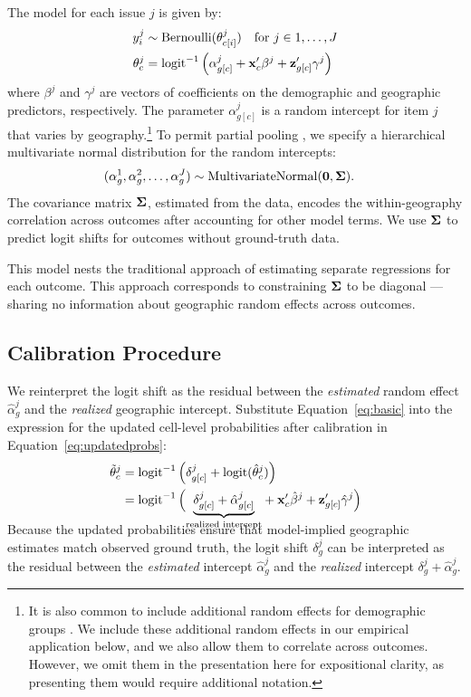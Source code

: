 The model for each issue $j$ is given by:
\begin{equation}
\begin{aligned}
	y^j_i &\sim \text{Bernoulli}(\theta_{c[i]}^j) \quad \text{for $j \in 1, \dots, J$}\\
	\theta_{c}^j &= \text{logit}^{-1}\left( \alpha_{{g}[c]}^j +    \mathbf{x}_c'\beta^{j} +   \mathbf{z}_{{g}[c]}'\gamma^{j}   \right)  \label{eq:basic}
\end{aligned}
\end{equation}
where $\beta^j$ and $\gamma^j$ are vectors of coefficients on the demographic and geographic predictors, respectively. 
The parameter $\alpha_{{g}[c]}^j$ is a random intercept for item $j$ that varies by geography.\footnote{It is also common to include additional random effects for demographic groups \citep{GG:2013}. We include these additional random effects in our empirical application below, and we also allow them to correlate across outcomes. However, we omit them in the presentation here for expositional clarity, as presenting them would require additional notation.}
To permit partial pooling \citep{Gelman2007}, we specify a hierarchical multivariate normal distribution for the random intercepts: 
\begin{align}
	&(\alpha_{{g}}^1, 	\alpha_{{g}}^2, \dots, \alpha_{{g}}^J) \sim \text{MultivariateNormal}(\mathbf{0}, \mathbf{\Sigma}). \label{eq:mvn}
\end{align}
The covariance matrix $\mathbf{\Sigma}$, estimated from the data, encodes the within-geography correlation across outcomes after accounting for other model terms. We use $\mathbf{\Sigma}$ to predict logit shifts for outcomes without ground-truth data.

This model nests the traditional approach of estimating separate regressions for each outcome. This approach corresponds to constraining $\mathbf{\Sigma}$ to be diagonal --- sharing no information about geographic random effects across outcomes.

\subsection{Calibration Procedure}

We reinterpret the logit shift as the residual between the \textit{estimated} random effect $\hat{\alpha}_{g}^j$ and the \textit{realized} geographic intercept. Substitute Equation~\eqref{eq:basic} into the  expression for the updated cell-level probabilities after calibration in Equation~\eqref{eq:updatedprobs}:
\begin{align*}
	\tilde{\theta}^{j}_c &= \text{logit}^{-1}\left(\delta_{g[c]}^j + \text{logit}(\hat{\theta}_c^j)  \right) \\ 
	              &= \text{logit}^{-1}\left(\smash{\underbrace{\delta_{g[c]}^j + \hat{\alpha}_{{g}[c]}^j}_{\text{realized intercept}}} +  \mathbf{x}_c' \hat{\beta}^{j} +  \mathbf{z}_{g[c]}' \hat{\gamma}^{j} \right)
\end{align*}
Because the updated probabilities ensure that model-implied geographic estimates match observed ground truth, the logit shift $\delta^j_g$ can be interpreted as the residual between the \textit{estimated} intercept $\hat{\alpha}_g^j$ and the \textit{realized} intercept $\delta^j_g + \hat{\alpha}_g^j$.


